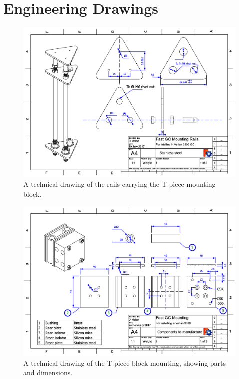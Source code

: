 
\chapter{Engineering Drawings} %

\label{AppendixD} 


\begin{figure}
	\centering
	\includegraphics[angle=90, origin=c, scale=0.75]{Figures/RailsDrawing.pdf}
	\decoRule	
	
	\caption[Technical drawing of coaxial heater mounting
	rails]{\label{fig:RailsDrawing}A technical drawing of the rails carrying the
	T-piece mounting block.}
	
\end{figure}

\begin{figure}
	\centering
	\includegraphics[angle=90, origin=c, scale=0.75]{Figures/CarDrawing1.pdf}
	\decoRule	
	
	\caption[Technical drawing of coaxial heater mounting.]{A technical drawing of
	the T-piece block mounting, showing parts and dimensions.}
	
	\label{fig:CarsDrawing1}
\end{figure}

